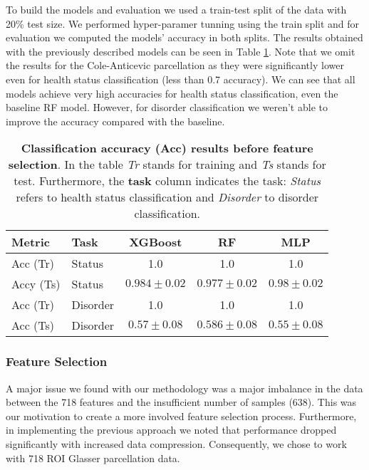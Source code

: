\documentclass[fleqn,moreauthors,10pt]{ds_report}
\begin{document}
To build the models and evaluation we used a train-test split of the data with 20\% test size. We performed hyper-paramer tunning using the train split and for evaluation we computed the models' accuracy in both splits. The results obtained with the previously described models can be seen in Table \ref{tab:glassier_classification}. Note that we omit the results for the Cole-Anticevic parcellation as they were significantly lower even for health status classification (less than 0.7 accuracy).  We can see that all models achieve very high accuracies for health status classification, even the baseline RF model. However, for disorder classification we weren't able to improve the accuracy compared with the baseline.

\begin{table}[h!]
\centering
\begin{tabular}{|l|l| c|c|c|}
\hline
\textbf{Metric} & \textbf{Task} & \textbf{XGBoost} & \textbf{RF}& \textbf{MLP} \\ \hline
Acc (Tr) & Status & 1.0 & 1.0 & 1.0  \\ \hline
Accy (Ts) & Status & $0.984 \pm 0.02$ & $0.977 \pm 0.02$ & $0.98 \pm 0.02$ \\ \hline
Acc (Tr) & Disorder & 1.0 & 1.0 & 1.0 \\ \hline
Acc (Ts) & Disorder & $0.57 \pm 0.08$ & $0.586 \pm 0.08$ & $0.55 \pm 0.08$ \\ \hline
\end{tabular}
\caption{\textbf{Classification accuracy (Acc) results before feature selection}. In the table \textit{Tr} stands for training and \textit{Ts} stands for test. Furthermore, the \textbf{task} column indicates the task: \textit{Status} refers to health status classification and \textit{Disorder} to disorder classification.}
\label{tab:glassier_classification}
\end{table}

\subsubsection*{Feature Selection}
 A major issue we found with our methodology was a major imbalance in the data between the 718 features and the insufficient number of samples (638). This was our motivation to create a more involved feature selection process. Furthermore, in  implementing the previous approach we noted that performance dropped significantly with increased data compression. Consequently, we chose to work with 718 ROI Glasser parcellation data. 
\end{document}
